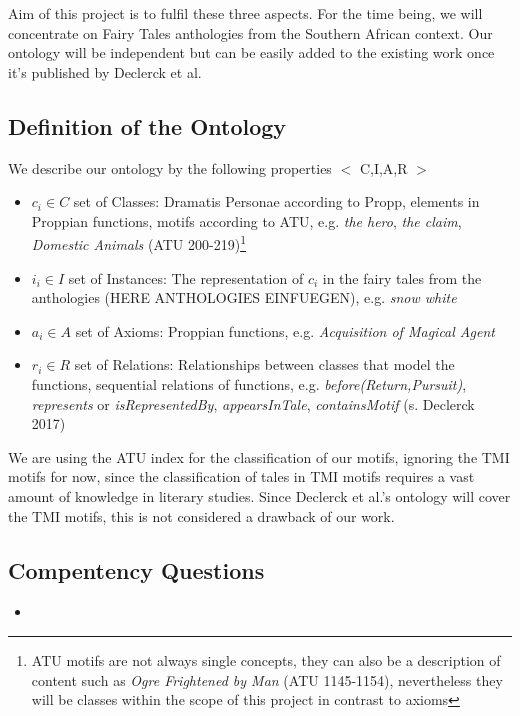 \documentclass[10pt,a4paper]{article}
\begin{document}
	Aim of this project is to fulfil these three aspects. For the time being, we will concentrate on Fairy Tales anthologies from the Southern African context. Our ontology will be independent but can be easily added to the existing work once it's published by Declerck et al. 
	\subsection{Definition of the Ontology}
	We describe our ontology by the following properties $<$ C,I,A,R $>$

\begin{itemize}
	
	\item $c_{i} \in C $ set of Classes: Dramatis Personae according to Propp, elements in Proppian functions, motifs according to ATU, e.g. \textit{the hero}, \textit{the claim},       \textit{Domestic Animals} (ATU 200-219)\footnote{ATU motifs are not always single concepts, they can also be a description of content such as \textit{Ogre Frightened by Man} (ATU 1145-1154), nevertheless they will be classes within the scope of this project in contrast to axioms}
	\item $i_{i} \in I $ set of Instances: The representation of $c_{i}$ in the fairy tales from the anthologies (HERE ANTHOLOGIES EINFUEGEN), e.g. \textit{snow white} 
	\item $a_{i} \in A$  set of Axioms: Proppian functions, e.g. \textit{Acquisition of Magical Agent} 
	\item $r_{i} \in R $ set of Relations: Relationships between classes that model the functions, sequential relations of functions, e.g. \textit{before(Return,Pursuit)}, \textit{represents} or \textit{isRepresentedBy}, \textit{appearsInTale}, \textit{containsMotif} (s. Declerck 2017)
	 
\end{itemize}

We are using the ATU index for the classification of our motifs, ignoring the TMI motifs for now, since the classification of tales in TMI motifs requires a vast amount of  knowledge in literary studies. Since Declerck et al.'s ontology will cover the TMI motifs, this is not considered a drawback of our work. 

	 \subsection{Compentency Questions}
	 	\begin{itemize}
			\item
		\end{itemize}
\end{document}
